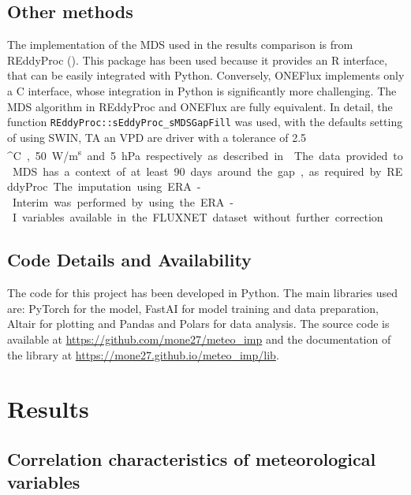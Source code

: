\documentclass{article}
\let\Oldsection\section
\renewcommand{\section}{\FloatBarrier\Oldsection}
\let\Oldsubsection\subsection
\renewcommand{\subsection}{\FloatBarrier\Oldsubsection}
\begin{document}
\subsection{Other methods}

The implementation of the MDS used in the results comparison is from \textsf{REddyProc} (\cite{wutzler_basic_2018}). This package has been used because it provides an R interface, that can be easily integrated with Python. Conversely, \textsf{ONEFlux} implements only a C interface, whose integration in Python is significantly more challenging.  The MDS algorithm in \textsf{REddyProc} and \textsf{ONEFlux} are fully equivalent. In detail, the function \verb|REddyProc::sEddyProc_sMDSGapFill| was used, with the defaults setting of using SW\textunderscore IN, TA an VPD are driver with a tolerance of 2.5 \si{^\circ C}, 50 \si{W/m^s} and 5 \si{hPa} respectively as described in \cite{reichstein_separation_2005-3}.
The data provided to MDS has a context of at least 90 days around the gap, as required by \textsf{REddyProc}. 

The imputation using ERA-Interim was performed by using the ERA-I variables available in the FLUXNET dataset without further correction.

\subsection{Code Details and Availability}

The code for this project has been developed in Python. The main libraries used are: \textsf{PyTorch} \cite{NEURIPS2019_9015} for the model,  \textsf{FastAI} \cite{howard_fastai_2020} for model training and data preparation, \textsf{Altair} \cite{VanderPlas2018,Satyanarayan2017} for plotting and \textsf{Pandas} and \textsf{Polars} for data analysis. The source code is available at \url{https://github.com/mone27/meteo_imp} and the documentation of the library at \url{https://mone27.github.io/meteo_imp/lib}.
\pagebreak

\section{Results}

\subsection{Correlation characteristics of meteorological variables}
\end{document}
